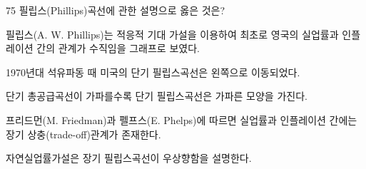 \begin{question}{75}
필립스(Phillips)곡선에 관한 설명으로 옳은 것은?
\begin{choices}
  \item 필립스(A. W. Phillips)는 적응적 기대 가설을 이용하여 최초로 영국의 실업률과 인플레이션 간의 관계가 수직임을 그래프로 보였다.
  \item 1970년대 석유파동 때 미국의 단기 필립스곡선은 왼쪽으로 이동되었다.
  \item 단기 총공급곡선이 가파를수록 단기 필립스곡선은 가파른 모양을 가진다.
  \item 프리드먼(M. Friedman)과 펠프스(E. Phelps)에 따르면 실업률과 인플레이션 간에는 장기 상충(trade-off)관계가 존재한다.
  \item 자연실업률가설은 장기 필립스곡선이 우상향함을 설명한다.
\end{choices}
\end{question}
